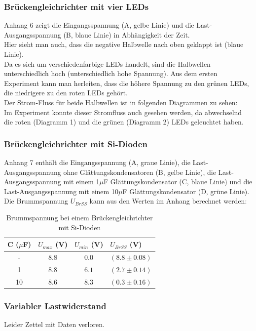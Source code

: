 \documentclass[12pt,a4paper,twopage]{article}
\begin{document}
\subsubsection{Brückengleichrichter mit vier LEDs}
Anhang 6 zeigt die Eingangsspannung (A, gelbe Linie) und die Last-Ausgangsspannung (B, blaue Linie) in Abhängigkeit der Zeit.\\
Hier sieht man auch, dass die negative Halbwelle nach oben geklappt ist (blaue Linie).\\ Da es sich um verschiedenfarbige LEDs handelt, sind die Halbwellen unterschiedlich hoch (unterschiedlich hohe Spannung). Aus dem ersten Experiment kann man herleiten, dass die höhere Spannung zu den grünen LEDs, die niedrigere zu den roten LEDs gehört.\\
Der Strom-Fluss für beide Halbwellen ist in folgenden Diagrammen zu sehen:
\vspace{7cm}
\\Im Experiment konnte dieser Stromfluss auch gesehen werden, da abwechselnd die roten (Diagramm 1) und die grünen (Diagramm 2) LEDs geleuchtet haben. 

\subsubsection{Brückengleichrichter mit Si-Dioden}
Anhang 7 enthält die Eingangsspannung (A, graue Linie), die Last-Ausgangsspannung ohne Glättungskondensatoren (B, gelbe Linie), die Last-Ausgangsspannung mit einem 1$\mu$F Glättungskondensator (C, blaue Linie) und die Last-Ausgangsspannung mit einem 10$\mu$F Glättungskondensator (D, grüne Linie). \\
Die Brummspannung $U_{BrSS}$ kann aus den Werten im Anhang berechnet werden:

\begin{table}[H]
\centering
\begin{tabular}{|c|c|c|l|}
\hline
C ($\mu$F) & $U_{max}$ (V) & $U_{min}$ (V) & $U_{BrSS}$ (V)\\
\hline
- & $8.8$ & $0.0$ & $(8.8 \pm 0.08)$\\
1 & $8.8$ & $6.1$ & $(2.7 \pm 0.14)$\\
10 & $8.6$ & $8.3$ & $(0.3 \pm 0.16)$\\
\hline
\end{tabular}
\caption{Brummspannung bei einem Brückengleichrichter mit Si-Dioden}
\end{table}

\subsubsection{Variabler Lastwiderstand}
Leider Zettel mit Daten verloren.

						
\end{document}
